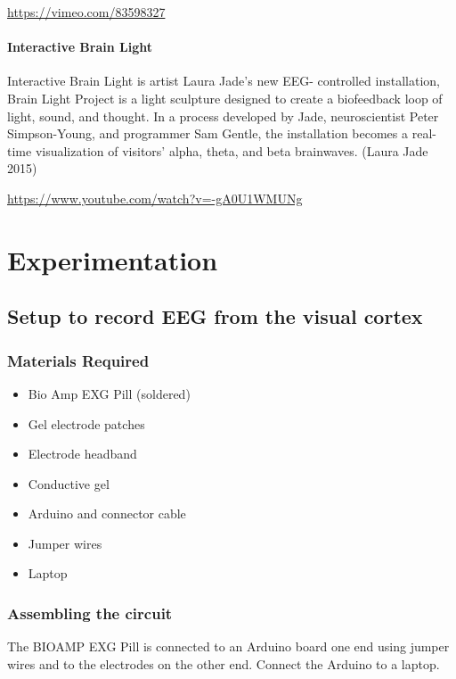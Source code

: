 \documentclass[
  letterpaper,
  DIV=11,
  numbers=noendperiod]{scrreprt}
\begin{document}
\url{https://vimeo.com/83598327}

\subsection{Interactive Brain Light}\label{interactive-brain-light}

Interactive Brain Light is artist Laura Jade's new EEG- controlled
installation, Brain Light Project is a light sculpture designed to
create a biofeedback loop of light, sound, and thought. In a process
developed by Jade, neuroscientist Peter Simpson-Young, and programmer
Sam Gentle, the installation becomes a real-time visualization of
visitors' alpha, theta, and beta brainwaves. (Laura Jade 2015)

\url{https://www.youtube.com/watch?v=-gA0U1WMUNg}

\part{Experimentation}

\chapter{Setup to record EEG from the visual
cortex}\label{setup-to-record-eeg-from-the-visual-cortex}

\section{Materials Required}\label{materials-required}

\begin{itemize}
\item
  Bio Amp EXG Pill (soldered)
\item
  Gel electrode patches
\item
  Electrode headband
\item
  Conductive gel
\item
  Arduino and connector cable
\item
  Jumper wires
\item
  Laptop
\end{itemize}

\section{Assembling the circuit}\label{assembling-the-circuit}

The BIOAMP EXG Pill is connected to an Arduino board one end using
jumper wires and to the electrodes on the other end. Connect the Arduino
to a laptop.
\end{document}
